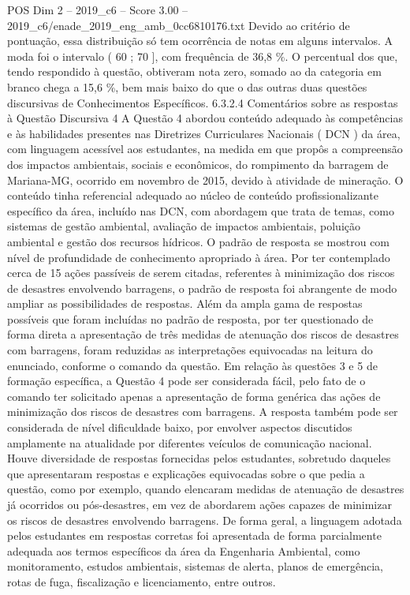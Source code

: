 \begin{textsample}{POS Dim 2 – 2019\_c6 – Score 3.00 – 2019\_c6/enade\_2019\_eng\_amb\_0cc6810176.txt}
Devido ao critério de pontuação, essa distribuição só tem ocorrência de notas em alguns intervalos.
A moda foi o intervalo ( 60 ; 70 ], com frequência de 36,8 \%.
O percentual dos que, tendo respondido à questão, obtiveram nota zero, somado ao da categoria em branco chega a 15,6 \%, bem mais baixo do que o das outras duas questões discursivas de Conhecimentos Específicos. 6.3.2.4 Comentários sobre as respostas à Questão Discursiva 4 A Questão 4 abordou conteúdo adequado às competências e às habilidades presentes nas Diretrizes Curriculares Nacionais ( DCN ) da área, com linguagem acessível aos estudantes, na medida em que propôs a compreensão dos impactos ambientais, sociais e econômicos, do rompimento da barragem de Mariana-MG, ocorrido em novembro de 2015, devido à atividade de mineração.
O conteúdo tinha referencial adequado ao núcleo de conteúdo profissionalizante específico da área, incluído nas DCN, com abordagem que trata de temas, como sistemas de gestão ambiental, avaliação de impactos ambientais, poluição ambiental e gestão dos recursos hídricos.
O padrão de resposta se mostrou com nível de profundidade de conhecimento apropriado à área.
Por ter contemplado cerca de 15 ações passíveis de serem citadas, referentes à minimização dos riscos de desastres envolvendo barragens, o padrão de resposta foi abrangente de modo ampliar as possibilidades de respostas.
Além da ampla gama de respostas possíveis que foram incluídas no padrão de resposta, por ter questionado de forma direta a apresentação de três medidas de atenuação dos riscos de desastres com barragens, foram reduzidas as interpretações equivocadas na leitura do enunciado, conforme o comando da questão.
Em relação às questões 3 e 5 de formação específica, a Questão 4 pode ser considerada fácil, pelo fato de o comando ter solicitado apenas a apresentação de forma genérica das ações de minimização dos riscos de desastres com barragens.
A resposta também pode ser considerada de nível dificuldade baixo, por envolver aspectos discutidos amplamente na atualidade por diferentes veículos de comunicação nacional.
Houve diversidade de respostas fornecidas pelos estudantes, sobretudo daqueles que apresentaram respostas e explicações equivocadas sobre o que pedia a questão, como por exemplo, quando elencaram medidas de atenuação de desastres já ocorridos ou pós-desastres, em vez de abordarem ações capazes de minimizar os riscos de desastres envolvendo barragens.
De forma geral, a linguagem adotada pelos estudantes em respostas corretas foi apresentada de forma parcialmente adequada aos termos específicos da área da Engenharia Ambiental, como monitoramento, estudos ambientais, sistemas de alerta, planos de emergência, rotas de fuga, fiscalização e licenciamento, entre outros.

\end{textsample}

